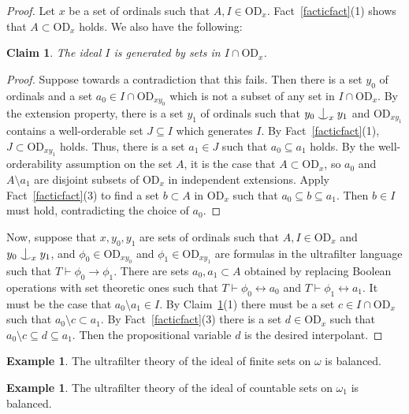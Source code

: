 \documentclass{article}
\newcommand{\gw}{\omega}
\newcommand{\forkindep}[1][]{%
  \mathrel{
    \mathop{
      \vcenter{
        \hbox{\oalign{\noalign{\kern-.3ex}\hfil$\vert$\hfil\cr
              \noalign{\kern-.7ex}
              $\smile$\cr\noalign{\kern-.3ex}}}
      }
    }\displaylimits_{#1}
  }
}
\newcommand{\liff}{\leftrightarrow}
\newcommand{\vd}{\mathrm{OD}}
\newtheorem{claim}[theorem]{Claim}
\theoremstyle{definition}
\newtheorem{example}[theorem]{Example}
\begin{document}
\begin{proof}
	Let $x$ be a set of ordinals such that $A, I\in\vd_x$. Fact~\ref{facticfact}(1) shows that $A\subset\vd_x$ holds. We also have the following:
	
	\begin{claim}
		\label{helpyclaim}
		The ideal $I$ is generated by sets in $I\cap\vd_x$.
	\end{claim}
	
	\begin{proof}
Suppose towards a contradiction that this fails. Then there is a set $y_0$ of ordinals and a set $a_0\in I\cap\vd_{xy_0}$ which is not a subset of any set in $I\cap \vd_x$. By the extension property, there is a set $y_1$ of ordinals such that $y_0\forkindep[x]y_1$ and $\vd_{xy_1}$ contains a well-orderable set $J\subseteq I$ which generates $I$. By Fact~\ref{facticfact}(1), $J\subset\vd_{xy_1}$ holds. Thus, there is a set $a_1\in J$ such that $a_0\subseteq a_1$ holds. By the well-orderability assumption on the set $A$, it is the case that $A\subset\vd_x$, so $a_0$ and $A\setminus a_1$ are disjoint subsets of $\vd_x$ in independent extensions. Apply Fact~\ref{facticfact}(3) to find a set $b\subset A$ in $\vd_x$ such that $a_0\subseteq b\subseteq a_1$. Then $b\in I$ must hold, contradicting the choice of $a_0$.
	\end{proof}
	
\noindent Now, suppose that $x, y_0, y_1$ are sets of ordinals such that $A, I\in\vd_x$ and $y_0\forkindep[x]y_1$, and $\phi_0\in\vd_{xy_0}$ and $\phi_1\in\vd_{xy_1}$ are formulas in the ultrafilter language such that $T\vdash\phi_0\to\phi_1$. There are sets $a_0, a_1\subset A$ obtained by replacing Boolean operations with set theoretic ones such that $T\vdash\phi_0\liff a_0$ and $T\vdash\phi_1\liff a_1$. It must be the case that $a_0\setminus a_1\in I$. By Claim~\ref{helpyclaim}(1) there must be a set $c\in I\cap\vd_x$ such that $a_0\setminus c\subset a_1$. By Fact~\ref{facticfact}(3) there is a set $d\in\vd_x$ such that $a_0\setminus c\subseteq d\subseteq a_1$. Then the propositional variable $d$ is the desired interpolant.
\end{proof}

\begin{example}
	The ultrafilter theory of the ideal of finite sets on $\gw$ is balanced.
\end{example}

\begin{example}
	The ultrafilter theory of the ideal of countable sets on $\gw_1$ is balanced.
\end{example}
\end{document}

